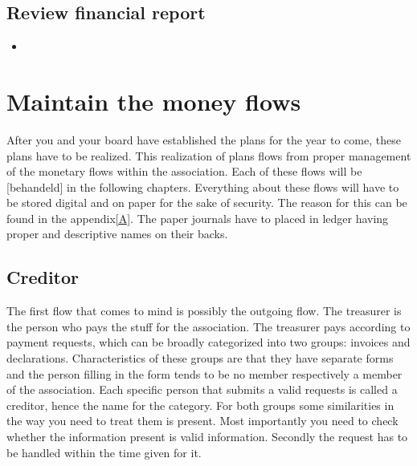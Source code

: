 \documentclass{report}
\begin{document}
\subsection{Review financial report}
\begin{itemize} 
\vspace{-1mm}
\itemsep-1mm 
\item 
\end{itemize}

\section{Maintain the money flows}
After you and your board have established the plans for the year to come, these plans have to be realized. This realization of plans flows from proper management of the monetary flows within the association. Each of these flows will be [behandeld] in the following chapters. Everything about these flows will have to be stored digital and on paper for the sake of security. The reason for this can be found in the appendix\ref{A}. The paper journals have to placed in ledger having proper and descriptive names on their backs.   

\subsection{Creditor}
The first flow that comes to mind is possibly the outgoing flow. The treasurer is the person who pays the stuff for the association. The treasurer pays according to payment requests, which can be broadly categorized into two groups: invoices and declarations. Characteristics of these groups are that they have separate forms and the person filling in the form tends to be no member respectively a member of the association. Each specific person that submits a valid requests is called a creditor, hence the name for the category. For both groups some similarities in the way you need to treat them is present. Most importantly you need to check whether the information present is valid information. Secondly the request has to be handled within the time given for it.          
\end{document}
